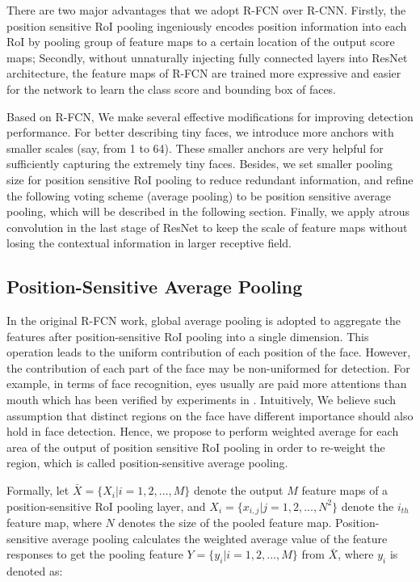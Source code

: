 \documentclass{article} \usepackage{nips13submit_e,times}
\newcommand{\ignore}[1]{}
\begin{document}
There are two major advantages that we adopt R-FCN over R-CNN. Firstly, the position sensitive RoI pooling ingeniously encodes position information into each RoI by pooling group of feature maps to a certain location of the output score maps; Secondly, without unnaturally injecting fully connected layers into ResNet architecture, the feature maps of R-FCN are trained more expressive and easier for the network to learn the class score and bounding box of faces. 

Based on R-FCN, We make several effective modifications for improving detection performance. For better describing tiny faces, we introduce more anchors with smaller scales (say, from 1 to 64). These smaller anchors are very helpful for sufficiently capturing the extremely tiny faces. Besides, we set smaller pooling size for position sensitive RoI pooling to reduce redundant information, and refine the following voting scheme (average pooling) to be position sensitive average pooling, which will be described in the following section. Finally, we apply atrous convolution in the last stage of ResNet to keep the scale of feature maps without losing the contextual information in larger receptive field\ignore{large receptive field}. 





\subsection{Position-Sensitive Average Pooling}

In the original R-FCN work, global average pooling is adopted to aggregate the features after position-sensitive RoI pooling into a single dimension. This operation leads to the uniform\ignore{equal} contribution of each position of the face. However, the contribution of each part of the face may be non-uniformed\ignore{not equal} for detection. For example, in terms of face recognition, eyes usually are paid more attentions than mouth which has been verified by experiments in \cite{ARdatabase}. 
Intuitively, We believe such assumption that distinct regions on the face have different importance should also hold in face detection. Hence, we propose to perform weighted average for each area of the output of position sensitive RoI pooling in order to re-weight the region, which is called position-sensitive average pooling. 


Formally, let $\bar X = \{ {X_i}|i = 1,2,...,M\}$ denote the output $M$ feature maps of a position-sensitive RoI pooling layer, and ${X_i} = \{ {x_{i,j}}|j = 1,2,...,N^2 \}$ denote the $i_{th}$ feature map, where $N$ denotes the size of the pooled feature map. Position-sensitive average pooling calculates the weighted average value of the feature responses to get the pooling feature $Y = \{ {y_i}|i = 1,2,...,M\}$ from $\bar X$, where $y_i$ is denoted as:
\end{document}

